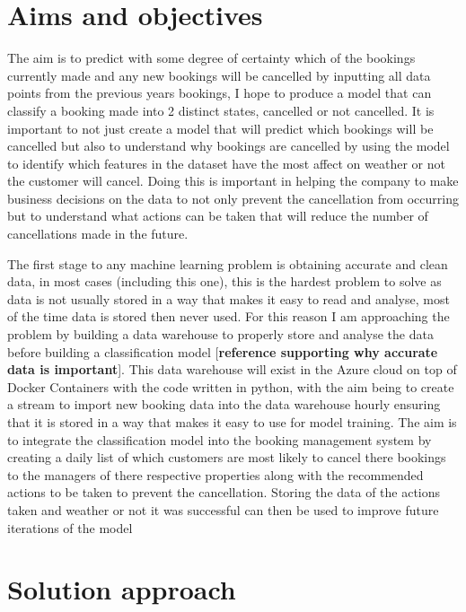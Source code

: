 \section{Aims and objectives}

The aim is to predict with some degree of certainty which of the bookings currently made and any new bookings will be cancelled by inputting all data points from the previous years bookings, I hope to produce a model that can classify a booking made into 2 distinct states, cancelled or not cancelled. It is important to not just create a model that will predict which bookings will be cancelled but also to understand why bookings are cancelled by using the model to identify which features in the dataset have the most affect on weather or not the customer will cancel. Doing this is important in helping the company to make business decisions on the data to not only prevent the cancellation from occurring but to understand what actions can be taken that will reduce the number of cancellations made in the future.  

The first stage to any machine learning problem is obtaining accurate and clean data, in most cases (including this one), this is the hardest problem to solve as data is not usually stored in a way that makes it easy to read and analyse, most of the time data is stored  then never used. For this reason I am approaching the problem by building a data warehouse to properly store and analyse the data before building a classification model [\textbf{reference supporting why accurate data is important}]. This data warehouse will exist in the Azure cloud on top of Docker Containers with the code written in python, with the aim being to create a stream to import new booking data into the data warehouse hourly ensuring that it is stored in a way that makes it easy to use for model training. The aim is to integrate the classification model into the booking management system by creating a daily list of which customers are most likely to cancel there bookings to the managers of there respective properties along with the recommended actions to be taken to prevent the cancellation. Storing the data of the actions taken and weather or not it was successful can then be used to improve future iterations of the model

\section{Solution approach}

